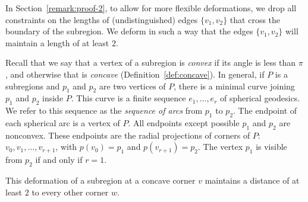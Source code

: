 \begin{remark}
\label{flexremark} In Section~\ref{remark:proof-2}, to allow for
more flexible deformations, we drop all constraints on the lengths
of (undistinguished) edges $\{v_1,v_2\}$ that cross the boundary of
the subregion.  We deform in such a way that the edges $\{v_1,v_2\}$
will maintain a length of at least $2$.
\end{remark}


Recall that we say that a vertex of a subregion is {\it convex\/}
if its angle is less than $\pi$, and otherwise that is {\it
concave}
(Definition~\ref{def:concave}).
%
In general, if $P$ is a subregions and $p_1$ and $p_2$ are two
vertices of $P$, there is a minimal curve joining $p_1$ and $p_2$
inside $P$.  This curve is a finite sequence $e_1,\ldots, e_r$ of
spherical geodesics.  We refer to this sequence as the {\it sequence
of arcs\/}  from $p_1$ to $p_2$. The endpoint of
each spherical arc is a vertex of $P$. All endpoints except possible
$p_1$ and $p_2$ are nonconvex. These endpoints are the radial
projections of corners of $P$: $v_0,v_1,\ldots,v_{r+1}$, with
$p(v_0)=p_1$ and $p(v_{r+1})=p_2$. The vertex $p_1$ is visible from
$p_2$ if and only if $r=1$.


\begin{lemma}\label{dist2}
This deformation of a subregion at a concave corner $v$ maintains
a distance of at least $2$ to every other corner $w$.
\end{lemma}

